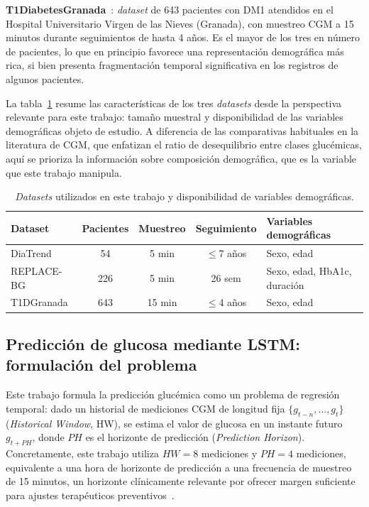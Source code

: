 \textbf{T1DiabetesGranada}~\cite{diaz2023t1dgranada}: \emph{dataset} de 643 pacientes con DM1 atendidos en el Hospital Universitario Virgen de las Nieves (Granada), con muestreo CGM a 15 minutos durante seguimientos de hasta 4 años. Es el mayor de los tres en número de pacientes, lo que en principio favorece una representación demográfica más rica, si bien presenta fragmentación temporal significativa en los registros de algunos pacientes.

La tabla~\ref{tab:datasets_comparacion_demografico} resume las características de los tres \emph{datasets} desde la perspectiva relevante para este trabajo: tamaño muestral y disponibilidad de las variables demográficas objeto de estudio. A diferencia de las comparativas habituales en la literatura de CGM, que enfatizan el ratio de desequilibrio entre clases glucémicas, aquí se prioriza la información sobre composición demográfica, que es la variable que este trabajo manipula.

\begin{table}[htbp]
\centering
\caption{\emph{Datasets} utilizados en este trabajo y disponibilidad de variables demográficas.}
\label{tab:datasets_comparacion_demografico}
\begin{tabular}{lcccl}
\hline
\textbf{Dataset} & \textbf{Pacientes} & \textbf{Muestreo} & \textbf{Seguimiento} & \textbf{Variables demogr\'aficas} \\
\hline
DiaTrend & 54 & 5 min & $\leq$7 a\~nos & Sexo, edad \\
REPLACE-BG & 226 & 5 min & 26 sem & Sexo, edad, HbA1c, duraci\'on \\
T1DGranada & 643 & 15 min & $\leq$4 a\~nos & Sexo, edad \\
\hline
\end{tabular}
\end{table}

\subsection{Predicción de glucosa mediante LSTM: formulación del problema}
\label{subsec:formulacion_problema}

Este trabajo formula la predicción glucémica como un problema de regresión temporal: dado un historial de mediciones CGM de longitud fija $\{g_{t-n}, \ldots, g_{t}\}$ (\emph{Historical Window}, HW), se estima el valor de glucosa en un instante futuro $g_{t+PH}$, donde $PH$ es el horizonte de predicción (\emph{Prediction Horizon}). Concretamente, este trabajo utiliza $HW=8$ mediciones y $PH=4$ mediciones, equivalente a una hora de horizonte de predicción a una frecuencia de muestreo de 15 minutos, un horizonte clínicamente relevante por ofrecer margen suficiente para ajustes terapéuticos preventivos~\cite{sparacino2007glucose}.

